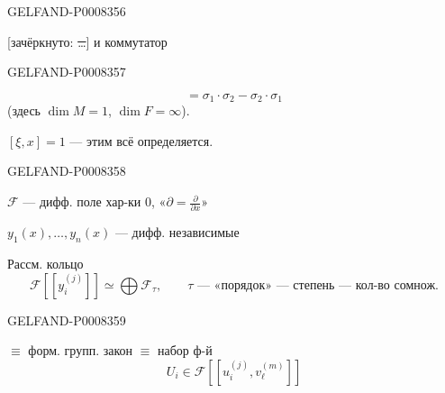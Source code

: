 \begin{GelfandAdjacentEvidence}{GELFAND-P000835}{6}


[зачёркнуто: \sout{…}] и коммутатор
\end{GelfandAdjacentEvidence}
\begin{GelfandAdjacentEvidence}{GELFAND-P000835}{7}

\begin{equation*}
[\sigma_1,\sigma_2]=\sigma_1\cdot\sigma_2-\sigma_2\cdot\sigma_1
\tag{5}
\end{equation*}
(здесь \(\dim M=1\), \(\dim F=\infty\)).

\([\xi,x]=1\) — этим всё определяется.

\end{GelfandAdjacentEvidence}
\begin{GelfandAdjacentEvidence}{GELFAND-P000835}{8}


\(\mathcal F\) — дифф. поле хар-ки \(0\), \qquad «\(\partial=\frac{\partial}{\partial x}\)»

\(y_1(x),\ldots,y_n(x)\) — дифф. независимые

Рассм. кольцо
\begin{equation*}
\mathcal F[[y_i^{(j)}]]\simeq\bigoplus\mathcal F_\tau,
\qquad \tau\text{ — «порядок» — степень — кол-во сомнож.}
\tag{6}
\end{equation*}
\end{GelfandAdjacentEvidence}
\begin{GelfandAdjacentEvidence}{GELFAND-P000835}{9}


 \(\equiv\) форм. групп. закон \(\equiv\) набор ф-й
\begin{equation*}
U_i\in\mathcal F[[u_i^{(j)},v_\ell^{(m)}]]
\tag{7}
\end{equation*}
\end{GelfandAdjacentEvidence}


